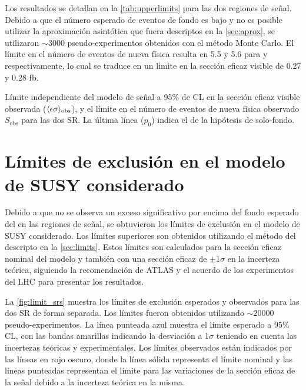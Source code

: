 Los resultados se detallan en la \cref{tab:upperlimits} para las dos regiones de
señal. Debido a que el número esperado de eventos de fondo es bajo y no es
posible utilizar la aproximación asintótica que fuera descriptos en la \cref{sec:aprox},
se utilizaron $\sim 3000$
pseudo-experimentos obtenidos con el método Monte Carlo. El límite en el número
de eventos de nueva física resulta en 5.5 y 5.6 para {\SRL} y {\SRH}
respectivamente, lo cual se traduce en un limite en la sección eficaz visible de
0.27 y 0.28 fb.


\begin{table}[!htbp]
  \centering

  \caption{Límite independiente del modelo de señal a 95\% de CL en la
    sección eficaz visible observada ($\langle\epsilon{\rm \sigma}\rangle_{\rm obs}$),
    y el límite en el número de eventos de nueva física observado
    $S_\text{obs}$ para las dos SR.
    La última línea ($p_0$) indica el {\pvalue} de la hipótesis de solo-fondo.}
  \label{tab:upperlimits}

  

\end{table}



\section{Límites de exclusión en el modelo de SUSY considerado}
\label{sec:susy_limits}

Debido a que no se observa un exceso significativo por encima del fondo esperado
del {\SM} en las regiones de señal, se obtuvieron los límites de exclusión en el
modelo de SUSY considerado. Los límites superiores son obtenidos utilizando el
método del {\cls} descripto en la \cref{sec:limits}. Estos límites son
calculados para la sección eficaz nominal del modelo y también con una sección
eficaz de $\pm 1 \sigma$ en la incerteza teórica, siguiendo la recomendación de
ATLAS y el acuerdo de los experimentos del LHC para presentar los resultados.

La \cref{fig:limit_srs} muestra los límites de exclusión esperados y
observados para las dos SR de forma separada. Los límites fueron obtenidos
utilizando $\sim 20000$ pseudo-experimentos. La línea punteada azul muestra el
límite esperado a 95\% CL, con las bandas amarillas indicando la desviación a
1$\sigma$ teniendo en cuenta las incertezas teóricas y experimentales. Los
límites observados están indicados por las líneas en rojo oscuro, donde la línea
sólida representa el límite nominal y las líneas punteadas representan el límite
para las variaciones de la sección eficaz de la señal debido a la incerteza
teórica en la misma.

